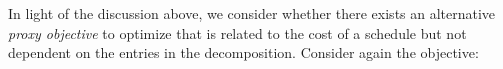 \documentclass{siamart190516}
\DeclareMathOperator*{\argmin}{arg\,min}
\begin{document}
In light of the discussion above, we consider whether there exists an alternative \emph{proxy objective} to optimize that is related to the cost of a schedule but not dependent on the entries in the decomposition. Consider again the objective: 
\end{document}
